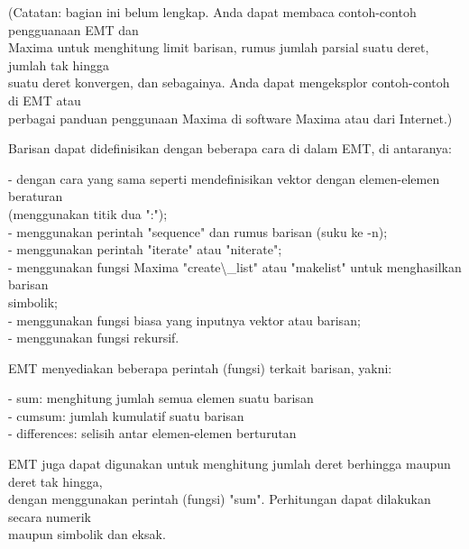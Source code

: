 \documentclass{article}
\begin{document}
\begin{eulernotebook}
\begin{eulercomment}
\begin{eulercomment}
\begin{eulercomment}
\begin{eulercomment}
\begin{eulercomment}
\begin{eulercomment}
\begin{eulercomment}
\begin{eulercomment}
\begin{eulercomment}
\begin{eulercomment}
\begin{eulercomment}
\begin{eulercomment}
\begin{eulercomment}
\begin{eulercomment}
\begin{eulercomment}
\begin{eulercomment}
\begin{eulercomment}
\begin{eulercomment}
\begin{eulercomment}
\begin{eulercomment}
\begin{eulercomment}
\begin{eulercomment}
\begin{eulercomment}
\begin{eulercomment}
\begin{eulercomment}
\begin{eulercomment}
\begin{eulercomment}
(Catatan: bagian ini belum lengkap. Anda dapat membaca contoh-contoh
pengguanaan EMT dan\\
Maxima untuk menghitung limit barisan, rumus jumlah parsial suatu
deret, jumlah tak hingga\\
suatu deret konvergen, dan sebagainya. Anda dapat mengeksplor
contoh-contoh di EMT atau\\
perbagai panduan penggunaan Maxima di software Maxima atau dari
Internet.)

Barisan dapat didefinisikan dengan beberapa cara di dalam EMT, di
antaranya:

- dengan cara yang sama seperti mendefinisikan vektor dengan
elemen-elemen beraturan\\
(menggunakan titik dua ":");\\
- menggunakan perintah "sequence" dan rumus barisan (suku ke -n);\\
- menggunakan perintah "iterate" atau "niterate";\\
- menggunakan fungsi Maxima "create\textbackslash{}\_list" atau "makelist" untuk
menghasilkan barisan\\
simbolik;\\
- menggunakan fungsi biasa yang inputnya vektor atau barisan;\\
- menggunakan fungsi rekursif.

EMT menyediakan beberapa perintah (fungsi) terkait barisan, yakni:

- sum: menghitung jumlah semua elemen suatu barisan\\
- cumsum: jumlah kumulatif suatu barisan\\
- differences: selisih antar elemen-elemen berturutan

EMT juga dapat digunakan untuk menghitung jumlah deret berhingga
maupun deret tak hingga,\\
dengan menggunakan perintah (fungsi) "sum". Perhitungan dapat
dilakukan secara numerik\\
maupun simbolik dan eksak.


\end{eulercomment}
\end{eulercomment}
\end{eulercomment}
\end{eulercomment}
\end{eulercomment}
\end{eulercomment}
\end{eulercomment}
\end{eulercomment}
\end{eulercomment}
\end{eulercomment}
\end{eulercomment}
\end{eulercomment}
\end{eulercomment}
\end{eulercomment}
\end{eulercomment}
\end{eulercomment}
\end{eulercomment}
\end{eulercomment}
\end{eulercomment}
\end{eulercomment}
\end{eulercomment}
\end{eulercomment}
\end{eulercomment}
\end{eulercomment}
\end{eulercomment}
\end{eulercomment}
\end{eulercomment}
\end{eulernotebook}
\end{document}
